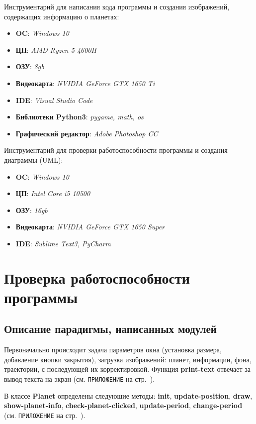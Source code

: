 \documentclass[14pt, oneside]{altsu-report}
\begin{document}
Инструментарий для написания кода программы и создания изображений, содержащих информацию о планетах:
    \begin{itemize}
        \item \textbf{OC}: \textit{Windows 10}
        \item \textbf{ЦП}: \textit{AMD Ryzen 5 4600H}
        \item \textbf{ОЗУ}: \textit{8gb}
        \item \textbf{Видеокарта}: \textit{NVIDIA GeForce GTX 1650 Ti}
        \item \textbf{IDE}: \textit{Visual Studio Code}
        \item \textbf{Библиотеки Python3}: \textit{pygame, math, os}
        \item \textbf{Графический редактор}: \textit{Adobe Photoshop CC}
    \end{itemize}

Инструментарий для проверки работоспособности программы и создания диаграммы (UML):
    \begin{itemize}
        \item \textbf{OC}: \textit{Windows 10}
        \item \textbf{ЦП}: \textit{Intel Core i5 10500}
        \item \textbf{ОЗУ}: \textit{16gb}
        \item \textbf{Видеокарта}: \textit{NVIDIA GeForce GTX 1650 Super}
        \item \textbf{IDE}: \textit{Sublime Text3, PyCharm}
    \end{itemize}


\chapter{Проверка работоспособности программы}\label{ch2}
\section{Описание парадигмы, написанных модулей}
Первоначально происходит задача параметров окна (установка размера, добавление кнопки закрытия), загрузка изображений: планет, информации, фона, траектории, с последующей их корректировкой. Функция \textbf{print-text} отвечает за вывод текста на экран (см. \texttt{ПРИЛОЖЕНИЕ} на стр.~\pageref{code:solar-sys}).

В классе \textbf{Planet} определены следующие методы: \textbf{init}, \textbf{update-position}, \textbf{draw}, \textbf{show-planet-info}, \textbf{check-planet-clicked}, \textbf{update-period}, \textbf{change-period} (см. \texttt{ПРИЛОЖЕНИЕ} на стр.~\pageref{code:solar-sys}).
\end{document}

